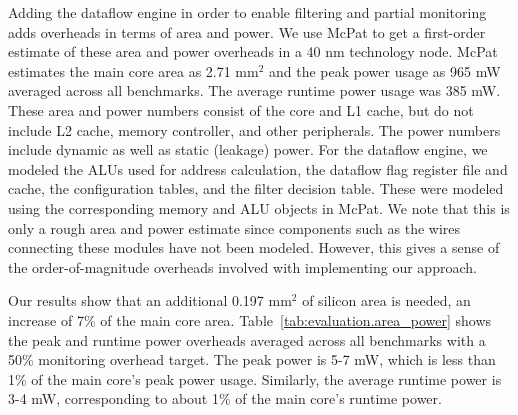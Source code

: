 Adding the dataflow engine in order to enable filtering and partial monitoring adds
overheads in terms of area and power. We use McPat \cite{mcpat-micro09} to get
a first-order estimate of these area and power overheads in a 40 nm technology
node. McPat estimates the main core area as 2.71 mm$^2$ and the peak power usage as
965 mW averaged across all benchmarks. The average runtime power usage was 385 
mW. These area and power numbers consist of the core and
L1 cache, but do not include L2 cache, memory controller, and other
peripherals. The power numbers include dynamic as well as static (leakage)
power. For the dataflow engine, we modeled the ALUs used for address
calculation, the dataflow flag register file and cache, the configuration
tables, and the filter decision table. These were modeled using the
corresponding memory and ALU objects in McPat. We
note that this is only a rough area and power estimate since components such as the
wires connecting these modules have not been modeled. However, this gives a
sense of the order-of-magnitude overheads involved with implementing our
approach.

Our results show that an additional 0.197 mm$^2$ of silicon area is needed, an
increase of 7\% of the main core area. Table~\ref{tab:evaluation.area_power}
shows the peak and runtime power overheads averaged across all benchmarks with
a 50\% monitoring overhead target. The peak power is 5-7 mW, which is
less than 1\% of the main core's peak power usage. Similarly, the average runtime power is 3-4 
mW, corresponding to about 1\% of the main core's runtime power.

